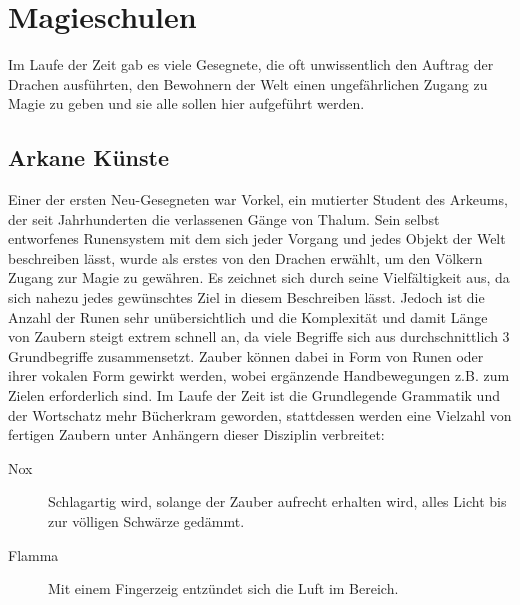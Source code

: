 \documentclass[a4paper,12pt,oneside]{book}
\begin{document}
\chapter{Magieschulen}
Im Laufe der Zeit gab es viele Gesegnete, die oft unwissentlich den Auftrag der Drachen ausführten, den Bewohnern der Welt einen ungefährlichen Zugang zu Magie zu geben und sie alle sollen hier aufgeführt werden.

\section{Arkane Künste}
Einer der ersten Neu-Gesegneten war Vorkel, ein mutierter Student des Arkeums, der seit Jahrhunderten die verlassenen Gänge von Thalum. Sein selbst entworfenes Runensystem mit dem sich jeder Vorgang und jedes Objekt der Welt beschreiben lässt, wurde als erstes von den Drachen erwählt, um den Völkern Zugang zur Magie zu gewähren. Es zeichnet sich durch seine Vielfältigkeit aus, da sich nahezu jedes gewünschtes Ziel in diesem Beschreiben lässt. Jedoch ist die Anzahl der Runen sehr unübersichtlich und die Komplexität und damit Länge von Zaubern steigt extrem schnell an, da viele Begriffe sich aus durchschnittlich 3 Grundbegriffe zusammensetzt. Zauber können dabei in Form von Runen oder ihrer vokalen Form gewirkt werden, wobei ergänzende Handbewegungen z.B. zum Zielen erforderlich sind. Im Laufe der Zeit ist die Grundlegende Grammatik und der Wortschatz mehr Bücherkram geworden, stattdessen werden eine Vielzahl von fertigen Zaubern unter Anhängern dieser Disziplin verbreitet: 
\begin{description}
\item[Nox]Schlagartig wird, solange der Zauber aufrecht erhalten wird, alles Licht bis zur völligen Schwärze gedämmt.
\item[Flamma]Mit einem Fingerzeig entzündet sich die Luft im Bereich.
\end{description}
\end{document}
